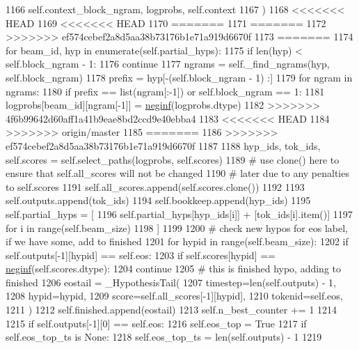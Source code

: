 \begin{DoxyCode}
1166                 self.context\_block\_ngram, logprobs, self.context
1167             )
1168 <<<<<<< HEAD
1169 <<<<<<< HEAD
1170 =======
1171 =======
1172 >>>>>>> ef574cebef2a8d5aa38b73176b1e71a919d6670f
1173 =======
1174             \textcolor{keywordflow}{for} beam\_id, hyp \textcolor{keywordflow}{in} enumerate(self.partial\_hyps):
1175                 \textcolor{keywordflow}{if} len(hyp) < self.block\_ngram - 1:
1176                     \textcolor{keywordflow}{continue}
1177                 ngrams = self.\_find\_ngrams(hyp, self.block\_ngram)
1178                 prefix = hyp[-(self.block\_ngram - 1) :]
1179                 \textcolor{keywordflow}{for} ngram \textcolor{keywordflow}{in} ngrams:
1180                     \textcolor{keywordflow}{if} prefix == list(ngram[:-1]) \textcolor{keywordflow}{or} self.block\_ngram == 1:
1181                         logprobs[beam\_id][ngram[-1]] = \hyperlink{namespaceparlai_1_1utils_1_1misc_a68c44ca571de7149b683539db659c330}{neginf}(logprobs.dtype)
1182 >>>>>>> 4f6b99642d60aff1a41b9eae8bd2ccd9e40ebba4
1183 <<<<<<< HEAD
1184 >>>>>>> origin/master
1185 =======
1186 >>>>>>> ef574cebef2a8d5aa38b73176b1e71a919d6670f
1187 
1188         hyp\_ids, tok\_ids, self.scores = self.select\_paths(logprobs, self.scores)
1189         \textcolor{comment}{# use clone() here to ensure that self.all\_scores will not be changed}
1190         \textcolor{comment}{# later due to any penalties to self.scores}
1191         self.all\_scores.append(self.scores.clone())
1192 
1193         self.outputs.append(tok\_ids)
1194         self.bookkeep.append(hyp\_ids)
1195         self.partial\_hyps = [
1196             self.partial\_hyps[hyp\_ids[i]] + [tok\_ids[i].item()]
1197             \textcolor{keywordflow}{for} i \textcolor{keywordflow}{in} range(self.beam\_size)
1198         ]
1199 
1200         \textcolor{comment}{#  check new hypos for eos label, if we have some, add to finished}
1201         \textcolor{keywordflow}{for} hypid \textcolor{keywordflow}{in} range(self.beam\_size):
1202             \textcolor{keywordflow}{if} self.outputs[-1][hypid] == self.eos:
1203                 \textcolor{keywordflow}{if} self.scores[hypid] == \hyperlink{namespaceparlai_1_1utils_1_1misc_a68c44ca571de7149b683539db659c330}{neginf}(self.scores.dtype):
1204                     \textcolor{keywordflow}{continue}
1205                 \textcolor{comment}{#  this is finished hypo, adding to finished}
1206                 eostail = \_HypothesisTail(
1207                     timestep=len(self.outputs) - 1,
1208                     hypid=hypid,
1209                     score=self.all\_scores[-1][hypid],
1210                     tokenid=self.eos,
1211                 )
1212                 self.finished.append(eostail)
1213                 self.n\_best\_counter += 1
1214 
1215         \textcolor{keywordflow}{if} self.outputs[-1][0] == self.eos:
1216             self.eos\_top = \textcolor{keyword}{True}
1217             \textcolor{keywordflow}{if} self.eos\_top\_ts \textcolor{keywordflow}{is} \textcolor{keywordtype}{None}:
1218                 self.eos\_top\_ts = len(self.outputs) - 1
1219 
\end{DoxyCode}
